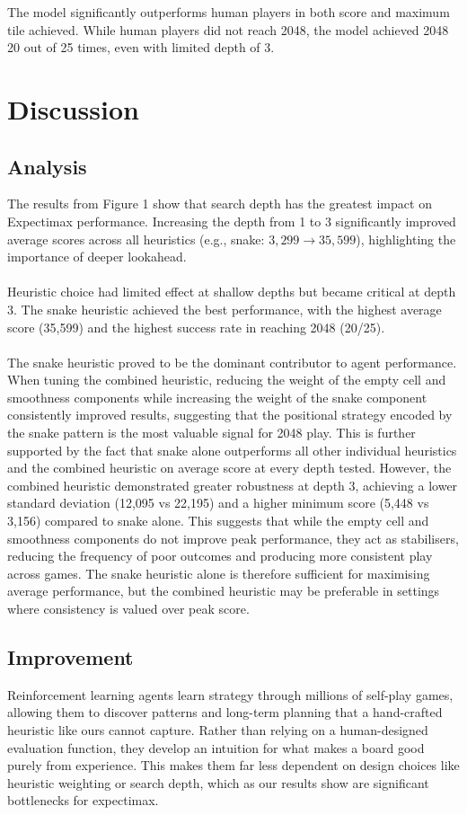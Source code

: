 \documentclass{article}
\begin{document}
The model significantly outperforms human players in both score and maximum tile achieved.
While human players did not reach 2048, the model achieved 2048 20 out of 25 times, even with limited depth of 3.

\section{Discussion}

\subsection{Analysis}

The results from Figure 1 show that search depth has the greatest impact on Expectimax performance.
Increasing the depth from 1 to 3 significantly improved average scores across all heuristics
(e.g., snake: $3,299 \rightarrow 35,599$), highlighting the importance of deeper lookahead.
\\
\\
Heuristic choice had limited effect at shallow depths but became critical at depth 3.
The snake heuristic achieved the best performance, with the highest average score (35,599) and the highest success 
rate in reaching 2048 (20/25).
\\
\\
The snake heuristic proved to be the dominant contributor to agent performance. When tuning the combined heuristic,
reducing the weight of the empty cell and smoothness components while increasing the weight of the snake component
consistently improved results, suggesting that the positional strategy encoded by the snake pattern is the most
valuable signal for 2048 play. This is further supported by the fact that snake alone outperforms all other individual
heuristics and the combined heuristic on average score at every depth tested. However, the combined heuristic
demonstrated greater robustness at depth 3, achieving a lower standard deviation (12,095 vs 22,195) and a higher
minimum score (5,448 vs 3,156) compared to snake alone. This suggests that while the empty cell and smoothness
components do not improve peak performance, they act as stabilisers, reducing the frequency of poor outcomes and
producing more consistent play across games. The snake heuristic alone is therefore sufficient for maximising average
performance, but the combined heuristic may be preferable in settings where consistency is valued over peak score.

\subsection{Improvement}

Reinforcement learning agents learn strategy through millions of self-play games, allowing them to discover
patterns and long-term planning that a hand-crafted heuristic like ours cannot capture. Rather than relying on
a human-designed evaluation function, they develop an intuition for what makes a board good purely from experience.
This makes them far less dependent on design choices like heuristic weighting or search depth, which as our results
show are significant bottlenecks for expectimax. 
\end{document}
